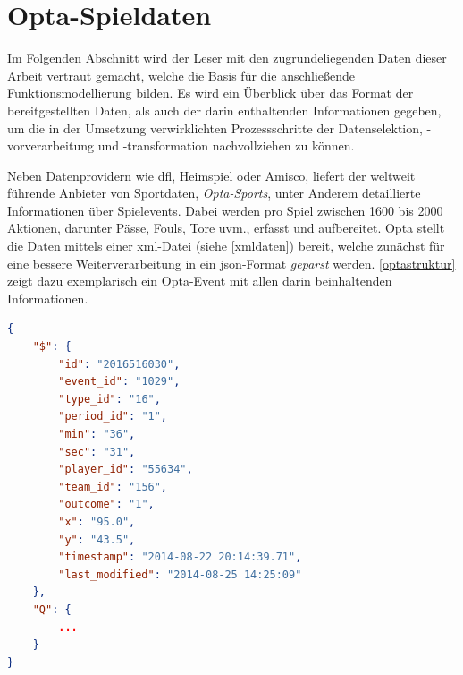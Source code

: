 \section{Opta-Spieldaten}
\label{opta}
Im Folgenden Abschnitt wird der Leser mit den zugrundeliegenden Daten dieser Arbeit vertraut gemacht, welche die Basis für die anschließende Funktionsmodellierung bilden. Es wird ein Überblick über das Format der bereitgestellten Daten, als auch der darin enthaltenden Informationen gegeben, um die in der Umsetzung verwirklichten Prozessschritte der Datenselektion, -vorverarbeitung und -transformation nachvollziehen zu können.

Neben Datenprovidern wie \gls{dfl}, Heimspiel oder Amisco, liefert der weltweit führende Anbieter von Sportdaten, \textit{Opta-Sports}, unter Anderem detaillierte Informationen über Spielevents. Dabei werden pro Spiel zwischen 1600 bis 2000 Aktionen, darunter Pässe, Fouls, Tore uvm., erfasst und aufbereitet. Opta stellt die Daten mittels einer \gls{xml}-Datei (siehe \vref{xmldaten}) bereit, welche zunächst für eine bessere Weiterverarbeitung in ein \gls{json}-Format \textit{geparst} werden. \vref{optastruktur} zeigt dazu exemplarisch ein Opta-Event mit allen darin beinhaltenden Informationen.
\newline

\begin{lstlisting}[caption=\captionListingText,language=json,xleftmargin=5mm,label=optastruktur] 
{
	"$": {
		"id": "2016516030",
		"event_id": "1029",
		"type_id": "16",
		"period_id": "1",
		"min": "36",
		"sec": "31",
		"player_id": "55634",
		"team_id": "156",
		"outcome": "1",
		"x": "95.0",
		"y": "43.5",
		"timestamp": "2014-08-22 20:14:39.71",
		"last_modified": "2014-08-25 14:25:09"
	},
	"Q": {
	    ...
	}
}
\end{lstlisting}


